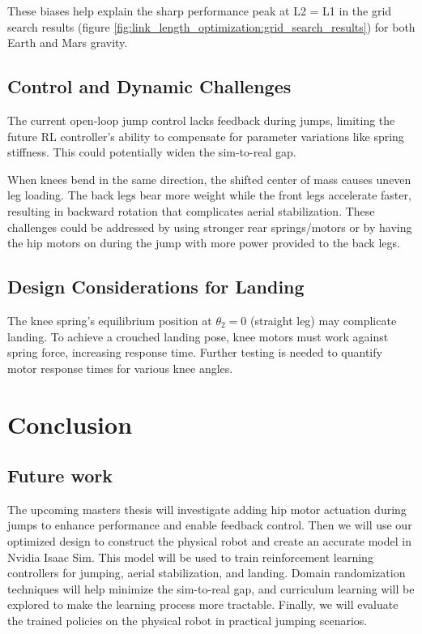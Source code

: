 These biases help explain the sharp performance peak at L2 = L1 in the grid search results (figure \ref{fig:link_length_optimization:grid_search_results}) for both Earth and Mars gravity.

\subsection{Control and Dynamic Challenges}
The current open-loop jump control lacks feedback during jumps, limiting the future RL controller's ability to compensate for parameter variations like spring stiffness. This could potentially widen the sim-to-real gap.

When knees bend in the same direction, the shifted center of mass causes uneven leg loading. The back legs bear more weight while the front legs accelerate faster, resulting in backward rotation that complicates aerial stabilization. These challenges could be addressed by using stronger rear springs/motors or by having the hip motors on during the jump with more power provided to the back legs.

\subsection{Design Considerations for Landing}
The knee spring's equilibrium position at $\theta_2=0$ (straight leg) may complicate landing. To achieve a crouched landing pose, knee motors must work against spring force, increasing response time. Further testing is needed to quantify motor response times for various knee angles.

\section{Conclusion}


\subsection{Future work}
The upcoming masters thesis will investigate adding hip motor actuation during jumps to enhance performance and enable feedback control. Then we will use our optimized design to construct the physical robot and create an accurate model in Nvidia Isaac Sim. This model will be used to train reinforcement learning controllers for jumping, aerial stabilization, and landing. Domain randomization techniques will help minimize the sim-to-real gap, and curriculum learning will be explored to make the learning process more tractable. Finally, we will evaluate the trained policies on the physical robot in practical jumping scenarios.
